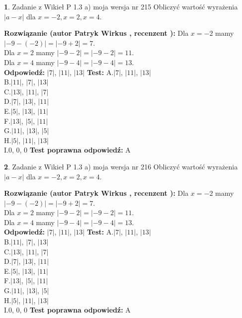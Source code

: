 \documentclass[12pt, a4paper]{article}
\theoremstyle{definition} %
\newtheorem{zad}{}
\newcommand{\zadStart}[1]{\begin{zad}#1\newline}
\newcommand{\zadStop}{\end{zad}}
\newcommand{\rozwStart}[2]{\noindent \textbf{Rozwiązanie (autor #1 , recenzent #2): }\newline}
\newcommand{\rozwStop}{\newline}
\newcommand{\odpStart}{\noindent \textbf{Odpowiedź:}\newline}
\newcommand{\odpStop}{\newline}
\newcommand{\testStart}{\noindent \textbf{Test:}\newline}
\newcommand{\testStop}{\newline}
\newcommand{\kluczStart}{\noindent \textbf{Test poprawna odpowiedź:}\newline}
\newcommand{\kluczStop}{\newline}
\begin{document}
\zadStart{Zadanie z Wikieł P 1.3 a) moja wersja nr 215}
Obliczyć wartość wyrażenia $|a - x|$ dla $x=-2,x=2,x=4$.
\zadStop
\rozwStart{Patryk Wirkus}{}
Dla $x = -2$ mamy $|-9 - (-2)| = |-9 + 2| = 7$.\\
Dla $x = 2$ mamy $|-9 - 2| = |-9 - 2| = 11$.\\
Dla $x = 4$ mamy $|-9 - 4| = |-9 - 4| = 13$.\\
\rozwStop
\odpStart
$|7|$, $|11|$, $|13|$
\odpStop
\testStart
A.$|7|$, $|11|$, $|13|$\\
B.$|11|$, $|7|$, $|13|$\\
C.$|13|$, $|11|$, $|7|$\\
D.$|7|$, $|13|$, $|11|$\\
E.$|5|$, $|13|$, $|11|$\\
F.$|13|$, $|5|$, $|11|$\\
G.$|11|$, $|13|$, $|5|$\\
H.$|5|$, $|11|$, $|13|$\\
I.$0$, $0$, $0$
\testStop
\kluczStart
A
\kluczStop



\zadStart{Zadanie z Wikieł P 1.3 a) moja wersja nr 216}
Obliczyć wartość wyrażenia $|a - x|$ dla $x=-2,x=2,x=4$.
\zadStop
\rozwStart{Patryk Wirkus}{}
Dla $x = -2$ mamy $|-9 - (-2)| = |-9 + 2| = 7$.\\
Dla $x = 2$ mamy $|-9 - 2| = |-9 - 2| = 11$.\\
Dla $x = 4$ mamy $|-9 - 4| = |-9 - 4| = 13$.\\
\rozwStop
\odpStart
$|7|$, $|11|$, $|13|$
\odpStop
\testStart
A.$|7|$, $|11|$, $|13|$\\
B.$|11|$, $|7|$, $|13|$\\
C.$|13|$, $|11|$, $|7|$\\
D.$|7|$, $|13|$, $|11|$\\
E.$|5|$, $|13|$, $|11|$\\
F.$|13|$, $|5|$, $|11|$\\
G.$|11|$, $|13|$, $|5|$\\
H.$|5|$, $|11|$, $|13|$\\
I.$0$, $0$, $0$
\testStop
\kluczStart
A
\kluczStop
\end{document}

